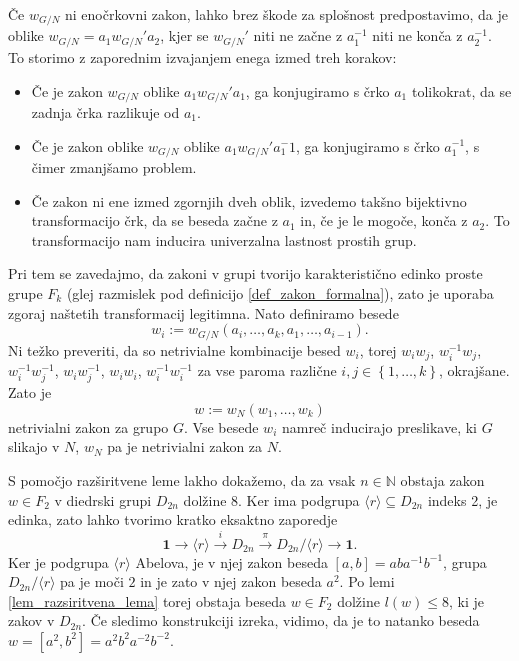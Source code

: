 \begin{dokaz}
        Če $w_{G / N}$ ni enočrkovni zakon, lahko brez škode za splošnost predpostavimo, da je oblike $w_{ G / N} = a_1 w_{ G / N}' a_2$, kjer se $w_{ G / N}'$ niti ne začne z $a_1^{-1}$ niti ne konča z $a_2^{-1}$.
        To storimo z zaporednim izvajanjem enega izmed treh korakov: \begin{itemize}
            \item Če je zakon $w_{ G / N}$ oblike $a_1 w_{ G / N}' a_1$, ga konjugiramo s črko $a_1$ tolikokrat, da se zadnja črka razlikuje od $a_1$.
            \item Če je zakon oblike $w_{ G / N}$ oblike $a_1 w_{ G / N}' a_1^-1$, ga konjugiramo s črko $a_1^{-1}$, s čimer zmanjšamo problem.
            \item Če zakon ni ene izmed zgornjih dveh oblik, izvedemo takšno bijektivno transformacijo črk, da se beseda začne z $a_1$ in, če je le mogoče, konča z $a_2$. To transformacijo nam inducira univerzalna lastnost prostih grup. 
        \end{itemize}
        Pri tem se zavedajmo, da zakoni v grupi tvorijo karakteristično edinko proste grupe $F_k$ (glej razmislek pod definicijo \ref{def_zakon_formalna}), zato je uporaba zgoraj naštetih transformacij legitimna. 
        Nato definiramo besede \begin{equation*}
   w_i := w_{ G / N}(a_{i}, \ldots, a_{k}, a_1, \ldots, a_{i - 1}).
   \end{equation*}  
   Ni težko preveriti, da so netrivialne kombinacije besed $w_i$, torej $w_{i} w_{j}$, $w_{i}^{-1} w_{j}$, \\ 
   $w_{i}^{-1} w_{j}^{-1}$,  $w_{i} w_{j}^{-1}$, $w_{i} w_{i}$, $w_{i}^{-1} w_{i}^{-1}$ za vse paroma različne $i,j \in \left\{ 1, \ldots, k \right\}$, okrajšane.
   Zato je \begin{equation*}
    w := w_N (w_1, \ldots, w_{k})
    \end{equation*}  
    netrivialni zakon za grupo $G$. Vse besede $w_{i}$ namreč inducirajo preslikave, ki $G$ slikajo v $N$, $w_N$ pa je netrivialni zakon za $N$.       
\end{dokaz}

\begin{primer}
    S pomočjo razširitvene leme lakho dokažemo, da za vsak $n \in \mathbb{N}$ obstaja zakon $w \in F_2$ v diedrski grupi $D_{2n}$ dolžine $8$. Ker ima podgrupa $\langle r \rangle \subseteq D_{2n}$ indeks 2, je edinka,
    zato lahko tvorimo kratko eksaktno zaporedje \begin{equation*}
        \mathbf{1} \to \langle r \rangle  \xrightarrow{i} D_{2n} \xrightarrow{\pi} D_{2n} / \langle r \rangle  \to \mathbf{1}.
        \end{equation*}
        Ker je podgrupa $\langle r \rangle$ Abelova, je v njej zakon beseda $[a, b] = aba^{-1} b^{-1}$, grupa $D_{2n} / \langle r \rangle$ pa je moči $2$ in je zato v njej zakon beseda $a^2$. Po lemi \ref{lem_razsiritvena_lema} torej obstaja beseda $w \in F_2$ dolžine $l(w) \le  8$, ki je zakov v $D_{2n}$.
        Če sledimo konstrukciji izreka, vidimo, da je to natanko beseda $w = [a^2, b^2] = a^2 b^2 a^{-2} b^{-2}$.   
\end{primer}

